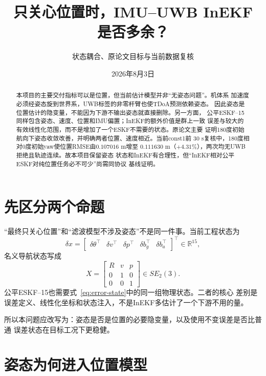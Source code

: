 \documentclass[11pt,a4paper]{ctexart}
\title{只关心位置时，IMU--UWB InEKF 是否多余？}
\author{状态耦合、原论文目标与当前数据复核}
\date{2026年8月3日}
\begin{document}
\pagestyle{plain}
\maketitle

\begin{abstract}
本项目的主要交付指标可以是位置，但当前估计模型并非“无姿态问题”。机体系
加速度必须经姿态旋到世界系，UWB标签的非零杆臂也使TDoA预测依赖姿态。
因此姿态是位置估计的隐变量，不能因为下游不输出姿态就直接删除。另一方面，
公平ESKF--15同样包含姿态、速度、位置和IMU偏置；InEKF的额外价值是群上一致
误差与较大的有效线性化范围，而不是增加了一个ESKF不需要的状态。原论文主要
证明180度初始航向下姿态收敛改善，并明确两者位置、速度相近。当前const1前
30 s复核中，180度相对0度初始yaw使位置RMSE由$0.107016$ m增至
$0.111630$ m（$+4.31\%$），两次均无UWB拒绝且轨迹连续。故本项目保留姿态
状态和InEKF有合理性，但“InEKF相对公平ESKF对纯位置任务必不可少”尚需同协议
基线证明。
\end{abstract}

\section{先区分两个命题}

“最终只关心位置”和“滤波模型不涉及姿态”不是同一件事。当前工程状态为
\begin{equation}
 \delta x=\begin{bmatrix}
 \delta\theta^\top&\delta v^\top&\delta p^\top&
 \delta b_g^\top&\delta b_a^\top
 \end{bmatrix}^\top\in\mathbb R^{15},
 \label{eq:error-state}
\end{equation}
名义导航状态写成
\begin{equation}
 X=\begin{bmatrix}R&v&p\\0&1&0\\0&0&1\end{bmatrix}
 \in SE_2(3).
 \label{eq:se23}
\end{equation}
公平ESKF--15也需要式~\eqref{eq:error-state}中的同一组物理状态。二者的核心
差别是误差定义、线性化坐标和状态注入，不是InEKF多估计了一个下游不用的量。

所以本问题应改写为：姿态是否是位置的必要隐变量，以及使用不变误差是否比普通
误差状态在目标工况下更稳健。

\section{姿态为何进入位置模型}
\end{document}
